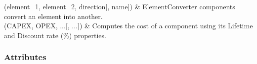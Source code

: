 \documentclass[letterpaper,10pt,english]{sphinxmanual}
\begin{document}
\begin{fulllineitems}
\begin{savenotes}
\begin{tabulary}{\linewidth}[t]{}
\sphinxAtStartPar
{\hyperref[\detokenize{generated/tamos.production.ElementConverter:tamos.production.ElementConverter.__init__}]{}}(element\_1, element\_2, direction{[}, name{]})
&
\sphinxAtStartPar
ElementConverter components convert an element into another.
\\
\hline
\sphinxAtStartPar
{\hyperref[\detokenize{generated/tamos.production.ElementConverter:tamos.production.ElementConverter.compute_actualized_cost}]{}}(CAPEX, OPEX, ...{[}, ...{]})
&
\sphinxAtStartPar
Computes the cost of a component using its \textquotesingle{}Lifetime\textquotesingle{} and \textquotesingle{}Discount rate (\%)\textquotesingle{} properties.
\\
\hline
\end{tabulary}
\par
\sphinxattableend\end{savenotes}
\subsubsection*{Attributes}


\begin{savenotes}\sphinxattablestart
\centering
\begin{tabulary}{\linewidth}[t]{}
\hline


\end{tabulary}
\end{savenotes}
\end{fulllineitems}
\end{document}
